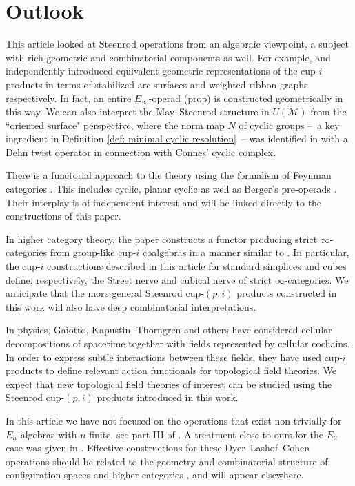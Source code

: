 
\section{Outlook} \label{s:outlook}

This article looked at Steenrod operations from an algebraic viewpoint, a subject with rich geometric and combinatorial components as well.
For example, \cite{Postnikov} and \cite{medina2018prop2} independently introduced equivalent geometric representations of the cup-$i$ products in terms of stabilized arc surfaces \cite{KLP} and weighted ribbon graphs respectively.
In fact, an entire $E_\infty$-operad (prop) is constructed geometrically in this way.
We can also interpret the May--Steenrod structure in $U(\mathcal M)$ from the ``oriented surface" perspective, where the norm map $N$ of cyclic groups --~a key ingredient in Definition \ref{def: minimal cyclic resolution}~-- was identified in \cite{KLP} with a Dehn twist operator in connection with Connes' cyclic complex.

There is a functorial approach to the theory using the formalism of Feynman categories \cite{feynman}.
This includes cyclic, planar cyclic as well as Berger's pre-operads \cite{BergerRecog}.
Their interplay is of independent interest \cite{BergerKaufmann, feyrep} and will be linked directly to the constructions of this paper.

In higher category theory, the paper \cite{medina2020globular} constructs a functor producing strict $\infty$-categories from group-like cup-$i$ coalgebras in a manner similar to \cite{steiner2004omega}.
In particular, the cup-$i$ constructions described in this article for standard simplices and cubes define, respectively, the Street nerve and cubical nerve of strict $\infty$-categories.
We anticipate that the more general Steenrod cup-$(p,i)$ products constructed in this work will also have deep combinatorial interpretations.

In physics, Gaiotto, Kapustin, Thorngren \cite{gaiotto2016spin, kapustin2017fermionic, bhardwaj2017fermionic} and others have considered cellular decompositions of spacetime together with fields represented by cellular cochains.
In order to express subtle interactions between these fields, they have used cup-$i$ products to define relevant action functionals for topological field theories.
We expect that new topological field theories of interest can be studied using the Steenrod cup-$(p,i)$ products introduced in this work.

In this article we have not focused on the operations that exist non-trivially for $E_n$-algebras with $n$ finite, see part III of \cite{may76homology}.
A treatment close to ours for the $E_2$ case was given in \cite{tourtchine2006cohen}.
Effective constructions for these Dyer--Lashof--Cohen operations should be related to the geometry and combinatorial structure of configuration spaces \cite{KZhang, sinha2013littledisks, berger2004combinatorial, ayala2014configuration} and higher categories \cite{Bathigher, BalFiedSchwVogt, Rezkhigher}, and will appear elsewhere.

